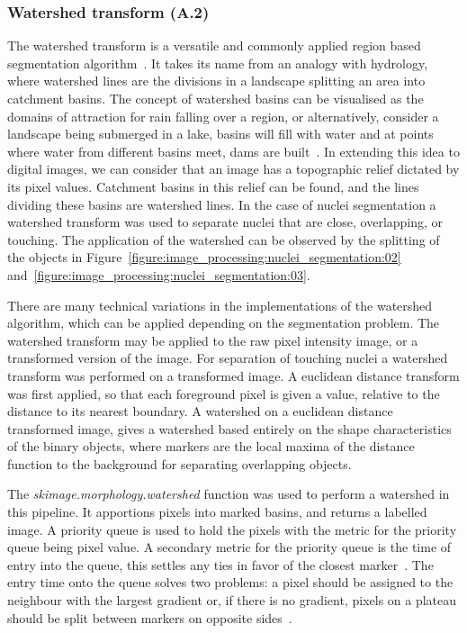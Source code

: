 \subsubsection{Watershed transform (A.2)}
The watershed transform is a versatile and commonly applied region based segmentation algorithm~\cite{Vincent1991}. It takes its name from an analogy with hydrology, where watershed lines are the divisions in a landscape splitting an area into catchment basins. The concept of watershed basins can be visualised as the domains of attraction for rain falling over a region, or alternatively, consider a landscape being submerged in a lake, basins will fill with water and at points where water from different basins meet, dams are built~\cite{Roerdink2000}. In extending this idea to digital images, we can consider that an image has a topographic relief dictated by its pixel values. Catchment basins in this relief can be found, and the lines dividing these basins are watershed lines. In the case of nuclei segmentation a watershed transform was used to separate nuclei that are close, overlapping, or touching. The application of the watershed can be observed by the splitting of the objects in Figure~\ref{figure:image_processing:nuclei_segmentation:02} and~\ref{figure:image_processing:nuclei_segmentation:03}.

There are many technical variations in the implementations of the watershed algorithm, which can be applied depending on the segmentation problem. The watershed transform may be applied to the raw pixel intensity image, or a transformed version of the image. For separation of touching nuclei a watershed transform was performed on a transformed image. A euclidean distance transform was first applied, so that each foreground pixel is given a value, relative to the distance to its nearest boundary. A watershed on a euclidean distance transformed image, gives a watershed based entirely on the shape characteristics of the binary objects, where markers are the local maxima of the distance function to the background for separating overlapping objects.

The \emph{skimage.morphology.watershed} function was used to perform a watershed in this pipeline. It apportions pixels into marked basins, and returns a labelled image. A priority queue is used to hold the pixels with the metric for the priority queue being pixel value. A secondary metric for the priority queue is the time of entry into the queue, this settles any ties in favor of the closest marker~\cite{scikit-image}. The entry time onto the queue solves two problems: a pixel should be assigned to the neighbour with the largest gradient or, if there is no gradient, pixels on a plateau should be split between markers on opposite sides~\cite{Soille1990}.

